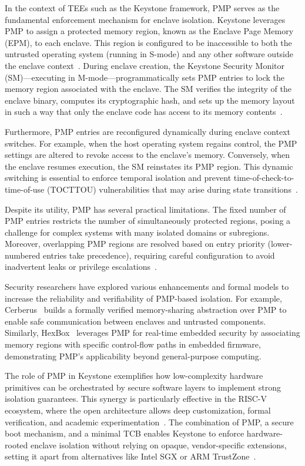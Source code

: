 In the context of TEEs such as the Keystone framework, PMP serves as the fundamental enforcement mechanism for enclave isolation. Keystone leverages PMP to assign a protected memory region, known as the Enclave Page Memory (EPM), to each enclave. This region is configured to be inaccessible to both the untrusted operating system (running in S-mode) and any other software outside the enclave context~\cite{dayeol2019keystone}. During enclave creation, the Keystone Security Monitor (SM)—executing in M-mode—programmatically sets PMP entries to lock the memory region associated with the enclave. The SM verifies the integrity of the enclave binary, computes its cryptographic hash, and sets up the memory layout in such a way that only the enclave code has access to its memory contents~\cite{lee2019keystone,keystone2025how}.

Furthermore, PMP entries are reconfigured dynamically during enclave context switches. For example, when the host operating system regains control, the PMP settings are altered to revoke access to the enclave’s memory. Conversely, when the enclave resumes execution, the SM reinstates its PMP region. This dynamic switching is essential to enforce temporal isolation and prevent time-of-check-to-time-of-use (TOCTTOU) vulnerabilities that may arise during state transitions~\cite{cerberus2022}.

Despite its utility, PMP has several practical limitations. The fixed number of PMP entries restricts the number of simultaneously protected regions, posing a challenge for complex systems with many isolated domains or subregions. Moreover, overlapping PMP regions are resolved based on entry priority (lower-numbered entries take precedence), requiring careful configuration to avoid inadvertent leaks or privilege escalations~\cite{riscvprivspec}.

Security researchers have explored various enhancements and formal models to increase the reliability and verifiability of PMP-based isolation. For example, Cerberus~\cite{cerberus2022} builds a formally verified memory-sharing abstraction over PMP to enable safe communication between enclaves and untrusted components. Similarly, HexBox~\cite{hexbox2018} leverages PMP for real-time embedded security by associating memory regions with specific control-flow paths in embedded firmware, demonstrating PMP's applicability beyond general-purpose computing.

The role of PMP in Keystone exemplifies how low-complexity hardware primitives can be orchestrated by secure software layers to implement strong isolation guarantees. This synergy is particularly effective in the RISC-V ecosystem, where the open architecture allows deep customization, formal verification, and academic experimentation~\cite{Survey2023}. The combination of PMP, a secure boot mechanism, and a minimal TCB enables Keystone to enforce hardware-rooted enclave isolation without relying on opaque, vendor-specific extensions, setting it apart from alternatives like Intel SGX or ARM TrustZone~\cite{dayeol2019keystone,turn0search0}.

